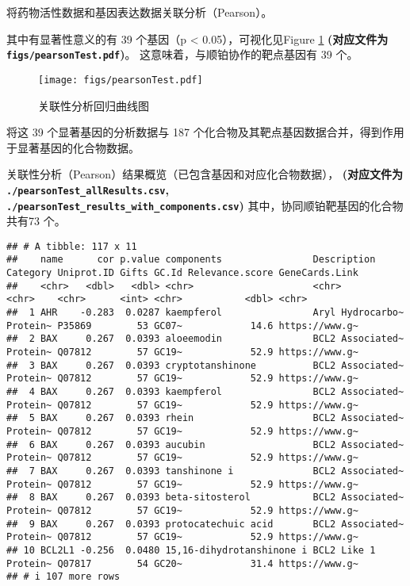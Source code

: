 \documentclass[
]{article}
\begin{document}
将药物活性数据和基因表达数据关联分析（Pearson）。

其中有显著性意义的有 39 个基因（p \textless{} 0.05），可视化见Figure \ref{fig:fig3}
\textbf{(对应文件为 \texttt{figs/pearsonTest.pdf})}。
这意味着，与顺铂协作的靶点基因有 39 个。

\begin{figure}
\centering
\texttt{[image: figs/pearsonTest.pdf]}
\caption{\label{fig:fig3}关联性分析回归曲线图}
\end{figure}

将这 39 个显著基因的分析数据与 187 个化合物及其靶点基因数据合并，得到作用于显著基因的化合物数据。

关联性分析（Pearson）结果概览（已包含基因和对应化合物数据），
\textbf{(对应文件为 \texttt{./pearsonTest\_allResults.csv}, \texttt{./pearsonTest\_results\_with\_components.csv})}
其中，协同顺铂靶基因的化合物共有73 个。

\begin{verbatim}
## # A tibble: 117 x 11
##    name      cor p.value components                Description      Category Uniprot.ID Gifts GC.Id Relevance.score GeneCards.Link
##    <chr>   <dbl>   <dbl> <chr>                     <chr>            <chr>    <chr>      <int> <chr>           <dbl> <chr>         
##  1 AHR    -0.283  0.0287 kaempferol                Aryl Hydrocarbo~ Protein~ P35869        53 GC07~            14.6 https://www.g~
##  2 BAX     0.267  0.0393 aloeemodin                BCL2 Associated~ Protein~ Q07812        57 GC19~            52.9 https://www.g~
##  3 BAX     0.267  0.0393 cryptotanshinone          BCL2 Associated~ Protein~ Q07812        57 GC19~            52.9 https://www.g~
##  4 BAX     0.267  0.0393 kaempferol                BCL2 Associated~ Protein~ Q07812        57 GC19~            52.9 https://www.g~
##  5 BAX     0.267  0.0393 rhein                     BCL2 Associated~ Protein~ Q07812        57 GC19~            52.9 https://www.g~
##  6 BAX     0.267  0.0393 aucubin                   BCL2 Associated~ Protein~ Q07812        57 GC19~            52.9 https://www.g~
##  7 BAX     0.267  0.0393 tanshinone i              BCL2 Associated~ Protein~ Q07812        57 GC19~            52.9 https://www.g~
##  8 BAX     0.267  0.0393 beta-sitosterol           BCL2 Associated~ Protein~ Q07812        57 GC19~            52.9 https://www.g~
##  9 BAX     0.267  0.0393 protocatechuic acid       BCL2 Associated~ Protein~ Q07812        57 GC19~            52.9 https://www.g~
## 10 BCL2L1 -0.256  0.0480 15,16-dihydrotanshinone i BCL2 Like 1      Protein~ Q07817        54 GC20~            31.4 https://www.g~
## # i 107 more rows
\end{verbatim}
\end{document}
